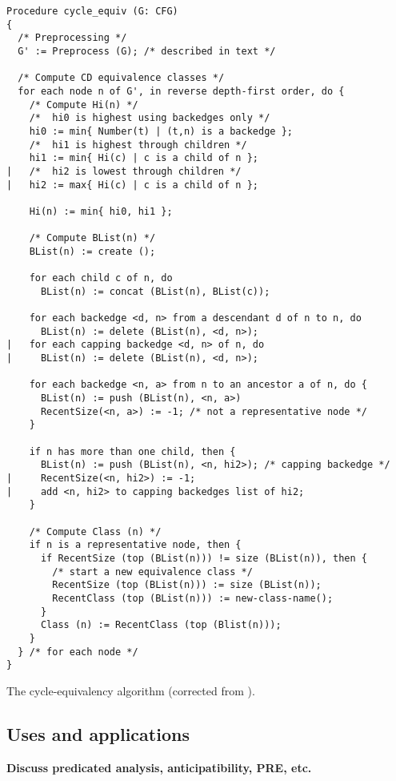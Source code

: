 \documentclass[12pt,notitlepage]{article}
\begin{document}
\begin{myfigure}\small\linespread{0.75}
\begin{verbatim}
Procedure cycle_equiv (G: CFG)
{
  /* Preprocessing */
  G' := Preprocess (G); /* described in text */

  /* Compute CD equivalence classes */
  for each node n of G', in reverse depth-first order, do {
    /* Compute Hi(n) */
    /*  hi0 is highest using backedges only */
    hi0 := min{ Number(t) | (t,n) is a backedge };
    /*  hi1 is highest through children */
    hi1 := min{ Hi(c) | c is a child of n };
|   /*  hi2 is lowest through children */
|   hi2 := max{ Hi(c) | c is a child of n };

    Hi(n) := min{ hi0, hi1 };

    /* Compute BList(n) */
    BList(n) := create ();

    for each child c of n, do
      BList(n) := concat (BList(n), BList(c));

    for each backedge <d, n> from a descendant d of n to n, do
      BList(n) := delete (BList(n), <d, n>);
|   for each capping backedge <d, n> of n, do
|     BList(n) := delete (BList(n), <d, n>);

    for each backedge <n, a> from n to an ancestor a of n, do {
      BList(n) := push (BList(n), <n, a>)
      RecentSize(<n, a>) := -1; /* not a representative node */
    }

    if n has more than one child, then {
      BList(n) := push (BList(n), <n, hi2>); /* capping backedge */
|     RecentSize(<n, hi2>) := -1;
|     add <n, hi2> to capping backedges list of hi2;
    }

    /* Compute Class (n) */
    if n is a representative node, then {
      if RecentSize (top (BList(n))) != size (BList(n)), then {
        /* start a new equivalence class */
        RecentSize (top (BList(n))) := size (BList(n));
        RecentClass (top (BList(n))) := new-class-name();
      }
      Class (n) := RecentClass (top (Blist(n)));
    }
  } /* for each node */
}
\end{verbatim}
\caption{The cycle-equivalency algorithm
	 (corrected from \cite{johnson93:sese}).}
\label{fig:CQalg}
\end{myfigure}

\subsection{Uses and applications}
\textbf{Discuss predicated analysis, anticipatibility, PRE, etc.}
\end{document}
